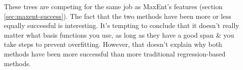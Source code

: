 These trees are competing for the same job as MaxEnt's features (section \ref{sec:maxent-success}). The fact that the two methods have been more or less equally successful is interesting. It's tempting to conclude that it doesn't really matter what basis functions you use, as long as they have a good span \& you take steps to prevent overfitting. However, that doesn't explain why both methods have been more successful than more traditional regression-based methods.
